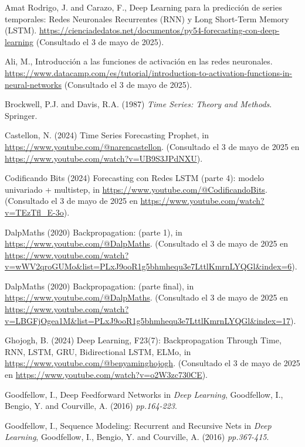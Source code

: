 \documentclass[12pt,twoside]{article}
\begin{document}
\begin{thebibliography}{100}


Amat Rodrigo, J. and Carazo, F., Deep Learning para la predicción de series temporales: Redes Neuronales Recurrentes (RNN) y Long Short-Term Memory (LSTM). \url{https://cienciadedatos.net/documentos/py54-forecasting-con-deep-learning} (Consultado el 3 de mayo de 2025).

Ali, M., Introducción a las funciones de activación en las redes neuronales. \url{https://www.datacamp.com/es/tutorial/introduction-to-activation-functions-in-neural-networks} (Consultado el 3 de mayo de 2025).

Brockwell, P.J. and Davis, R.A. (1987) \textit{Time Series: Theory and Methods}. Springer.

Castellon, N. (2024) Time Series Forecasting Prophet, in \url{https://www.youtube.com/@narencastellon}. (Consultado el 3 de mayo de 2025 en \url{https://www.youtube.com/watch?v=UB9S3JPdNXU}).

Codificando Bits (2024) Forecasting con Redes LSTM (parte 4): modelo univariado + multistep, in \url{https://www.youtube.com/@CodificandoBits}. (Consultado el 3 de mayo de 2025 en \url{https://www.youtube.com/watch?v=TEzTfl_E-3o}).

DalpMaths (2020) Backpropagation: (parte 1), in \url{https://www.youtube.com/@DalpMaths}. (Consultado el 3 de mayo de 2025 en \url{https://www.youtube.com/watch?v=wWV2qroGUMo&list=PLxJ9ooR1g5bhmhequ3e7LttlKmrnLYQGl&index=6}).

DalpMaths (2020) Backpropagation: (parte final), in \url{https://www.youtube.com/@DalpMaths}. (Consultado el 3 de mayo de 2025 en \url{https://www.youtube.com/watch?v=LBGFjOgea1M&list=PLxJ9ooR1g5bhmhequ3e7LttlKmrnLYQGl&index=17}).

Ghojogh, B. (2024) Deep Learning, F23(7): Backpropagation Through Time, RNN, LSTM, GRU, Bidirectional LSTM, ELMo, in \url{https://www.youtube.com/@benyaminghojogh}. (Consultado el 3 de mayo de 2025 en \url{https://www.youtube.com/watch?v=o2W3zc730CE}).

Goodfellow, I., Deep Feedforward Networks in \textit{Deep Learning}, Goodfellow, I., Bengio, Y. and Courville, A. (2016) \textit{pp.164-223}.

Goodfellow, I., Sequence Modeling: Recurrent and Recursive Nets in \textit{Deep Learning}, Goodfellow, I., Bengio, Y. and Courville, A. (2016) \textit{pp.367-415}.


\end{thebibliography}
\end{document}
